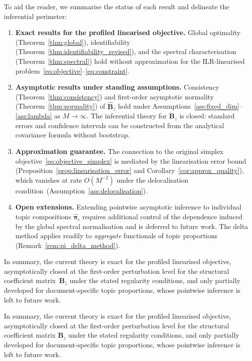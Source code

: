 \documentclass{article}
\begin{document}
To aid the reader, we summarise the status of each result and
delineate the inferential perimeter:
%
\begin{enumerate}
  \item \textbf{Exact results for the profiled linearised objective.}
    Global optimality (Theorem~\ref{thm:global}),
    identifiability (Theorem~\ref{thm:identifiability_revised}), and
    the spectral characterisation (Theorem~\ref{thm:spectral})
    hold without approximation for the ILR-linearised
    problem~\eqref{eq:objective}--\eqref{eq:constraint}.

  \item \textbf{Asymptotic results under standing assumptions.}
    Consistency (Theorem~\ref{thm:consistency}) and first-order
    asymptotic normality (Theorem~\ref{thm:normality}) of
    $\hat{\mathbf{B}}_z$ hold under
    Assumptions~\ref{ass:fixed_dim}--\ref{ass:lambda} as
    $M\to\infty$. The inferential theory for $\mathbf{B}_z$ is
    closed: standard errors and confidence intervals can be
    constructed from the analytical covariance formula without
    bootstrap.

  \item \textbf{Approximation guarantee.}
    The connection to the original simplex
    objective~\eqref{eq:objective_simplex} is mediated by the
    linearisation error bound
    (Proposition~\ref{prop:linearisation_error} and
    Corollary~\ref{cor:approx_quality}), which vanishes at rate
    $O(M^{-2})$ under the delocalisation
    condition~(Assumption~\ref{ass:delocalisation}).

  \item \textbf{Open extensions.}
    Extending pointwise asymptotic inference to individual topic
    compositions $\hat{\boldsymbol{\pi}}_i$ requires additional
    control of the dependence induced by the global spectral
    normalisation and is deferred to future work.
    The delta method applies readily to \emph{aggregate} functionals
    of topic proportions (Remark~\ref{rem:pi_delta_method}).
\end{enumerate}

\noindent
In summary, the current theory is exact for the profiled linearised
objective, asymptotically closed at the first-order perturbation level
for the structural coefficient matrix~$\mathbf{B}_z$ under the stated
regularity conditions, and only partially developed for
document-specific topic proportions, whose pointwise inference is left
to future work.

\noindent
In summary, the current theory is exact for the profiled linearised
objective, asymptotically closed at the first-order perturbation level
for the structural coefficient matrix $\mathbf{B}_z$ under the stated
regularity conditions, and only partially developed for
document-specific topic proportions, whose pointwise inference is left
to future work.
\end{document}
